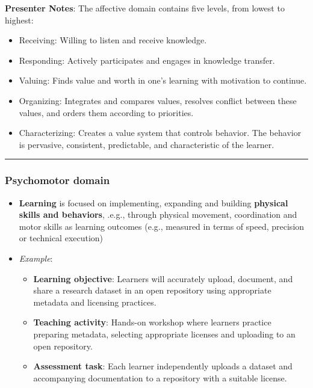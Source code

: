 \documentclass[
  letterpaper,
  DIV=11,
  numbers=noendperiod]{scrartcl}
\providecommand{\tightlist}{%
  \setlength{\itemsep}{0pt}\setlength{\parskip}{0pt}}
\begin{document}
\textbf{Presenter Notes}: The affective domain contains five levels,
from lowest to highest:

\begin{itemize}
\tightlist
\item
  Receiving: Willing to listen and receive knowledge.
\item
  Responding: Actively participates and engages in knowledge transfer.
\item
  Valuing: Finds value and worth in one's learning with motivation to
  continue.
\item
  Organizing: Integrates and compares values, resolves conflict between
  these values, and orders them according to priorities.
\item
  Characterizing: Creates a value system that controls behavior. The
  behavior is pervasive, consistent, predictable, and characteristic of
  the learner.
\end{itemize}

\begin{center}\rule{0.5\linewidth}{0.5pt}\end{center}

\subsubsection{Psychomotor domain}\label{psychomotor-domain}

\begin{itemize}
\item
  \textbf{Learning} is focused on implementing, expanding and building
  \textbf{physical skills and behaviors}, .e.g., through physical
  movement, coordination and motor skills as learning outcomes (e.g.,
  measured in terms of speed, precision or technical execution)
\item
  \emph{Example}:

  \begin{itemize}
  \tightlist
  \item
    \textbf{Learning objective}: Learners will accurately upload,
    document, and share a research dataset in an open repository using
    appropriate metadata and licensing practices.
  \item
    \textbf{Teaching activity}: Hands-on workshop where learners
    practice preparing metadata, selecting appropriate licenses and
    uploading to an open repository.
  \item
    \textbf{Assessment task}: Each learner independently uploads a
    dataset and accompanying documentation to a repository with a
    suitable license.
  \end{itemize}
\end{itemize}
\end{document}
